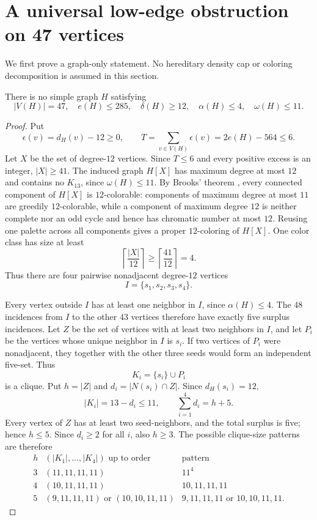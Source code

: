 \section{A universal low-edge obstruction on 47 vertices}
\label{sec:low-edge}

We first prove a graph-only statement. No hereditary density cap or coloring decomposition is assumed in this section.

\begin{theorem}
\label{thm:low-edge}
There is no simple graph $H$ satisfying
\[
|V(H)|=47,\quad e(H)\leq285,\quad
\delta(H)\geq12,\quad\alpha(H)\leq4,\quad\omega(H)\leq11.
\]
\end{theorem}

\begin{proof}
Put
\[
\epsilon(v)=d_H(v)-12\geq0,\qquad
T=\sum_{v\in V(H)}\epsilon(v)=2e(H)-564\leq6.
\]
Let $X$ be the set of degree-$12$ vertices. Since $T\leq6$ and every positive excess is an integer, $|X|\geq41$. The induced graph $H[X]$ has maximum degree at most $12$ and contains no $K_{13}$, since $\omega(H)\leq11$. By Brooks' theorem \citep{Brooks1941}, every connected component of $H[X]$ is $12$-colorable: components of maximum degree at most $11$ are greedily $12$-colorable, while a component of maximum degree $12$ is neither complete nor an odd cycle and hence has chromatic number at most $12$. Reusing one palette across all components gives a proper $12$-coloring of $H[X]$. One color class has size at least
\[
\left\lceil\frac{|X|}{12}\right\rceil\geq
\left\lceil\frac{41}{12}\right\rceil=4.
\]
Thus there are four pairwise nonadjacent degree-$12$ vertices
\[
I=\{s_1,s_2,s_3,s_4\}.
\]

Every vertex outside $I$ has at least one neighbor in $I$, since $\alpha(H)\leq4$. The $48$ incidences from $I$ to the other $43$ vertices therefore have exactly five surplus incidences. Let $Z$ be the set of vertices with at least two neighbors in $I$, and let $P_i$ be the vertices whose unique neighbor in $I$ is $s_i$. If two vertices of $P_i$ were nonadjacent, they together with the other three seeds would form an independent five-set. Thus
\[
K_i=\{s_i\}\cup P_i
\]
is a clique. Put $h=|Z|$ and $d_i=|N(s_i)\cap Z|$. Since $d_H(s_i)=12$,
\[
|K_i|=13-d_i\leq11,\qquad
\sum_{i=1}^4d_i=h+5.
\]
Every vertex of $Z$ has at least two seed-neighbors, and the total surplus is five; hence $h\leq5$. Since $d_i\geq2$ for all $i$, also $h\geq3$. The possible clique-size patterns are therefore
\[
\begin{array}{c|c|c}
h&(|K_1|,\ldots,|K_4|)\text{ up to order}&
\text{pattern}\\ \hline
3&(11,11,11,11)&11^4\\
4&(10,11,11,11)&10,11,11,11\\
5&(9,11,11,11)\text{ or }(10,10,11,11)&
9,11,11,11\text{ or }10,10,11,11.
\end{array}
\]


\end{proof}
